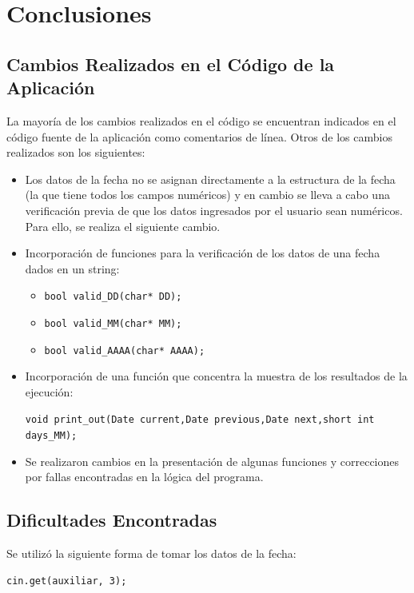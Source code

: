 \documentclass[a4paper,12pt]{article}
\begin{document}
\section{Conclusiones}
\subsection{Cambios Realizados en el Código de la Aplicación}

La mayoría de los cambios realizados en el código se encuentran indicados en el código fuente de la aplicación como comentarios de línea. Otros de los cambios realizados son los siguientes:

\begin{itemize}
    \item Los datos de la fecha no se asignan directamente a la estructura de la fecha (la que tiene todos los campos numéricos) y en cambio se lleva a cabo una verificación previa de que los datos ingresados por el usuario sean numéricos. Para ello, se realiza el siguiente cambio.
    \item Incorporación de funciones para la verificación de los datos de una fecha dados en un string:
    \begin{itemize}
        \item \texttt{bool valid\_DD(char* DD);}
        \item \texttt{bool valid\_MM(char* MM);}
        \item \texttt{bool valid\_AAAA(char* AAAA);}
    \end{itemize}
    \item Incorporación de una función que concentra la muestra de los resultados de la ejecución:
    
     \texttt{void print\_out(Date current,Date previous,Date next,short int days\_MM);}
    \item Se realizaron cambios en la presentación de algunas funciones y correcciones por fallas encontradas en la lógica del programa.
\end{itemize}

\subsection{Dificultades Encontradas}

Se utilizó la siguiente forma de tomar los datos de la fecha:

\begin{verbatim}
cin.get(auxiliar, 3);
\end{verbatim}
\end{document}
